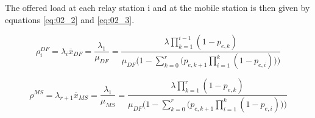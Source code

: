 The offered load at each relay station i and at the mobile station is then given
by equations \ref{eq:02_2} and \ref{eq:02_3}.

\begin{equation}
  \rho_i^{DF} = \lambda_i \overline{x}_{DF} = \dfrac{\lambda_1}{\mu_{DF}} =
  \dfrac{\lambda \prod\limits_{k=1}^{i-1} (1 - p_{e,k})}{\mu_{DF}\Bigg(1 - \sum\limits_{k=0}^r \Big(p_{e,k+1} \prod\limits_{i=1}^k (1 - p_{e,i})\Big)\Bigg)}
  \label{eq:02_2}
\end{equation}

\begin{equation}
  \rho^{MS} = \lambda_{r+1} \overline{x}_{MS} = \dfrac{\lambda_1}{\mu_{MS}} =
  \dfrac{\lambda \prod\limits_{k=1}^{r} (1 - p_{e,k})}{\mu_{DF}\Bigg(1 - \sum\limits_{k=0}^r \Big(p_{e,k+1} \prod\limits_{i=1}^k (1 - p_{e,i})\Big)\Bigg)}
  \label{eq:02_3}
\end{equation}
